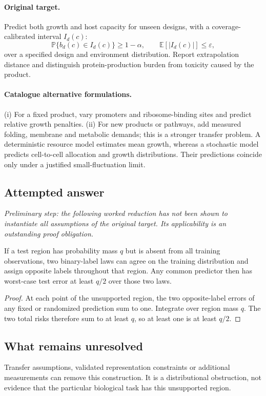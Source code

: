 \documentclass[11pt]{article}
\begin{document}
\paragraph{Original target.}
Predict both growth and host capacity for unseen designs, with a coverage-calibrated interval $I_d(c)$:
\[
\mathbb{P}\{b_d(c)\in I_d(c)\}\geq1-\alpha,
\qquad\mathbb{E}[|I_d(c)|]\leq\varepsilon,
\]
over a specified design and environment distribution. Report extrapolation distance and distinguish protein-production burden from toxicity caused by the product.
\paragraph{Catalogue alternative formulations.}
(i) For a fixed product, vary promoters and ribosome-binding sites and predict relative growth penalties. (ii) For new products or pathways, add measured folding, membrane and metabolic demands; this is a stronger transfer problem. A deterministic resource model estimates mean growth, whereas a stochastic model predicts cell-to-cell allocation and growth distributions. Their predictions coincide only under a justified small-fluctuation limit.
\subsection{Attempted answer}
\noindent\emph{Preliminary step: the following worked reduction has not been shown to instantiate all assumptions of the original target. Its applicability is an outstanding proof obligation.}

\begin{proposition}
If a test region has probability mass $q$ but is absent from all training observations, two binary-label laws can agree on the training distribution and assign opposite labels throughout that region. Any common predictor then has worst-case test error at least $q/2$ over those two laws.
\end{proposition}
\begin{proof}
At each point of the unsupported region, the two opposite-label errors of any fixed or randomized prediction sum to one. Integrate over region mass $q$. The two total risks therefore sum to at least $q$, so at least one is at least $q/2$.
\end{proof}
\subsection{What remains unresolved}
Transfer assumptions, validated representation constraints or additional measurements can remove this construction. It is a distributional obstruction, not evidence that the particular biological task has this unsupported region.
\end{document}
